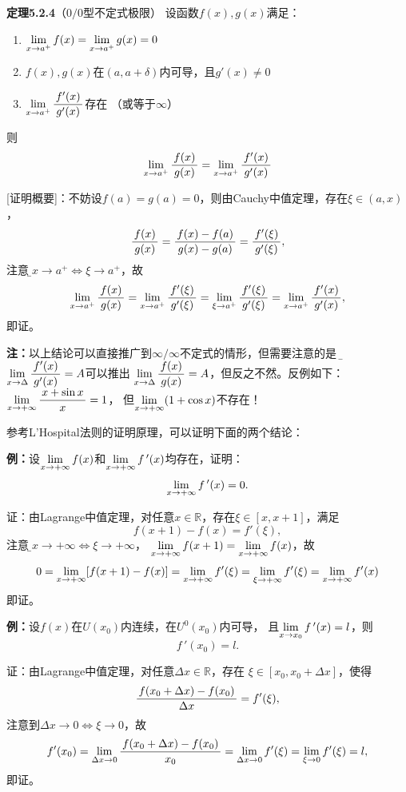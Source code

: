 {\bf 定理5.2.4}（$0/0$型不定式极限）
设函数$f(x),g(x)$满足： 
\begin{enumerate}[(1)]
  \setlength{\itemindent}{1cm}
  \item $\lim\limits_{x\to{a^+}}f(x)=\lim\limits_{x\to{a^+}}g(x)=0$ 
  \item $f(x),g(x)$在$(a,a+\delta)$内可导，且$g'(x)\ne 0$ 
  \item $\lim\limits_{x\to{a^+}}\displaystyle\frac{\,{f'(x)}\,}{\,{g'(x)}\,}$存在 （或等于$\infty$） 
\end{enumerate}
则
$$\lim\limits_{x\to{a^+}}\displaystyle\frac{\,{f(x)}\,}{\,{g(x)}\,}=\lim\limits_{x\to{a^+}}\displaystyle\frac{\,{f'(x)}\,}{\,{g'(x)}\,}$$

[证明概要]：不妨设$f(a)=g(a)=0$，则由Cauchy中值定理，存在$\xi\in(a,x)$，
$$\displaystyle\frac{\,{f(x)}\,}{\,{g(x)}\,}=\displaystyle\frac{\,{f(x)-f(a)}\,}{\,{g(x)-g(a)}\,}
=\displaystyle\frac{\,{f'(\xi)}\,}{\,{g'(\xi)}\,},$$
注意到{\b$x\to a^+\Leftrightarrow\xi\to a^+$}，故
$$\lim\limits_{x\to{a^+}}\displaystyle\frac{\,{f(x)}\,}{\,{g(x)}\,}=\lim\limits_{x\to{a^+}}\displaystyle\frac{\,{f'(\xi)}\,}{\,{g'(\xi)}\,}
=\lim\limits_{\xi\to a^+}\displaystyle\frac{\,{f'(\xi)}\,}{\,{g'(\xi)}\,}
=\lim\limits_{x\to{a^+}}\displaystyle\frac{\,{f'(x)}\,}{\,{g'(x)}\,},$$
即证。

{\bf 注：}以上结论可以直接推广到$\infty/\infty$不定式的情形，但需要注意的是
{\b 由$\lim\limits_{x\to{\Delta}}\displaystyle\frac{\,{f'(x)}\,}{\,{g'(x)}\,}=A$可以推出
$\lim\limits_{x\to{\Delta}}\displaystyle\frac{\,{f(x)}\,}{\,{g(x)}\,}=A$，但反之不然。}反例如下：
$\lim\limits_{x\to{+\infty}}\displaystyle\frac{\,{x+\sin x}\,}{\,{x}\,}=1$，
但$\lim\limits_{x\to{+\infty}}(1+\cos x)$不存在！

参考L'Hospital法则的证明原理，可以证明下面的两个结论：

{\bf 例：}设$\lim\limits_{x\to{+\infty}}f(x)$和$\lim\limits_{x\to{+\infty}}f\,'(x)$均存在，证明：
$$\lim\limits_{x\to{+\infty}}f\,'(x)=0.$$

证：由Lagrange中值定理，对任意$x\in\mathbb{R}$，存在$\xi\in[x,x+1]$，满足
$$f(x+1)-f(x)=f'(\xi),$$
注意到{\b$x\to+\infty\Leftrightarrow\xi\to+\infty$}，
$\lim\limits_{x\to{+\infty}}f(x+1)=\lim\limits_{x\to{+\infty}}f(x)$，故
$$0=\lim\limits_{x\to{+\infty}}[f(x+1)-f(x)]=\lim\limits_{x\to{+\infty}}f'(\xi)
=\lim\limits_{\xi\to+\infty}f'(\xi)=\lim\limits_{x\to{+\infty}}f'(x)$$
即证。

{\bf 例：}设$f(x)$在$U(x_0)$内连续，在$U^0(x_0)$内可导，
且$\lim\limits_{x\to{x_0}}f\,'(x)=l$，则$$f\,'(x_0)=l.$$

证：由Lagrange中值定理，对任意$\Delta x\in\mathbb{R}$，存在
$\xi\in[x_0,x_0+\Delta x]$，使得
$$\displaystyle\frac{\,{f(x_0+\Delta x)-f(x_0)}\,}{\,{\Delta x}\,}=f'(\xi),$$
注意到$\Delta x\to 0\Leftrightarrow\xi\to0$，故
$$f'(x_0)=\lim\limits_{\Delta x\to 0}\displaystyle\frac{\,{f(x_0+\Delta x)-f(x_0)}\,}{\,{x_0}\,}
=\lim\limits_{\Delta x\to 0}f'(\xi)=\lim\limits_{\xi\to 0}f'(\xi)=l,$$
即证。

